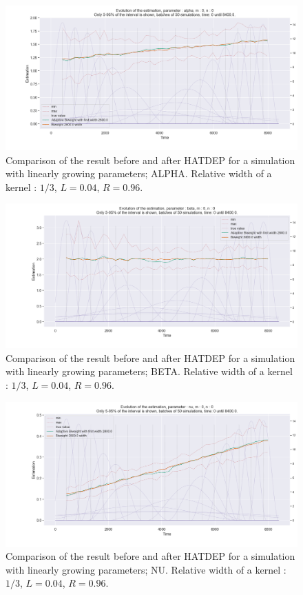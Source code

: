 \begin{figure}
\centering
\includegraphics[width = 0.90 \textwidth]{../imag/chap3/1/D.png}
\caption{Comparison of the result before and after HATDEP for a simulation with linearly growing parameters; ALPHA. Relative width of a kernel : $1/3$, $L = 0.04$, $R = 0.96$.}
\label{fig:first_estimate_1_alpha}
\end{figure}

\begin{figure}
\centering
\includegraphics[width = 0.90 \textwidth]{../imag/chap3/1/E.png}
\caption{Comparison of the result before and after HATDEP for a simulation with linearly growing parameters; BETA. Relative width of a kernel : $1/3$, $L = 0.04$, $R = 0.96$.}
\label{fig:first_estimate_1_beta}
\end{figure}

\begin{figure}
\centering
\includegraphics[width = 0.90 \textwidth]{../imag/chap3/1/F.png}
\caption{Comparison of the result before and after HATDEP for a simulation with linearly growing parameters; NU. Relative width of a kernel : $1/3$, $L = 0.04$, $R = 0.96$.}
\label{fig:first_estimate_1_nu}
\end{figure}

















